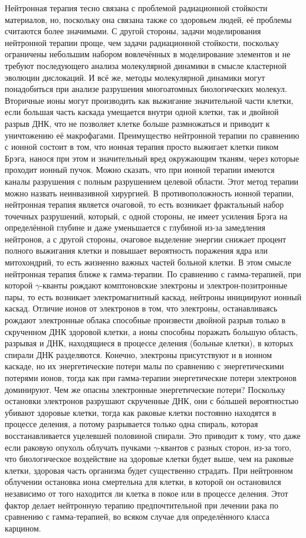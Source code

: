 \documentclass[a4paper,12pt]{article}
\begin{document}
\begin{large}
	Нейтронная терапия тесно связана с проблемой радиационной стойкости материалов, но, поскольку она связана также со здоровьем людей, её проблемы считаются более значимыми.
	С другой стороны, задачи моделирования нейтронной терапии проще, чем задачи радиационной стойкости, поскольку ограничены небольшим набором вовлечённых в моделирование элементов и не требуют последующего анализа молекулярной динамики в смысле кластерной эволюции дислокаций.
	И всё же, методы молекулярной динамики могут понадобиться при анализе разрушения многоатомных биологических молекул.
	Вторичные ионы могут производить как выжигание значительной части клетки, если большая часть каскада умещается внутри одной клетки, так и двойной разрыв ДНК, что не позволяет клетке больше размножаться и приводит к уничтожению её макрофагами.
	Преимущество нейтронной терапии по сравнению с ионной состоит в том, что ионная терапия просто выжигает клетки пиком Брэга, нанося при этом и значительный вред окружающим тканям, через которые проходит ионный пучок.
	Можно сказать, что при ионной терапии имеются каналы разрушения с полным разрушением целевой области.
	Этот метод терапии можно назвать неинвазивной хирургией.
	В противоположность ионной терапии, нейтронная терапия является очаговой, то есть возникает фрактальный набор точечных разрушений, который, с одной стороны, не имеет усиления Брэга на определённой глубине и даже уменьшается с глубиной из-за замедления нейтронов, а с другой стороны, очаговое выделение энергии снижает процент полного выжигания клетки и повышает вероятность поражения ядра или митохондрий, то есть жизненно важных частей больной клетки.
	В этом смысле нейтронная терапия ближе к гамма-терапии.
	По сравнению с гамма-терапией, при которой $\gamma$-кванты рождают комптоновские электроны и электрон-позитронные пары, то есть возникает электромагнитный каскад, нейтроны инициируют ионный каскад.
	Отличие ионов от электронов в том, что электроны, останавливаясь рождают электронные облака способные произвести двойной разрыв только в скрученном ДНК здоровой клетки, а ионы способны поражать большую область, разрывая и ДНК, находящиеся в процессе деления (больные клетки), в которых спирали ДНК разделяются.
	Конечно, электроны присутствуют и в ионном каскаде, но их энергетические потери малы по сравнению с энергетическими потерями ионов, тогда как при гамма-терапии энергетические потери электронов доминируют.
	Чем же опасны электронные энергетические потери?
	Поскольку остановки электронов разрушают скрученные ДНК, они с б\'{о}льшей вероятностью убивают здоровые клетки, тогда как раковые клетки постоянно находятся в процессе деления, а потому разрывается только одна спираль, которая восстанавливается уцелевшей половиной спирали.
	Это приводит к тому, что даже если раковую опухоль облучать пучками $\gamma$-квантов с разных сторон, из-за того, что биологическое воздействие на здоровые клетки будет выше, чем на раковые клетки, здоровая часть организма будет существенно страдать.
	При нейтронном облучении остановка иона смертельна для клетки, в которой он остановился независимо от того находится ли клетка в покое или в процессе деления.
	Этот фактор делает нейтронную терапию предпочтительной при лечении рака по сравнению с гамма-терапией, во всяком случае для определённого класса карцином.


\end{large}
\end{document}
